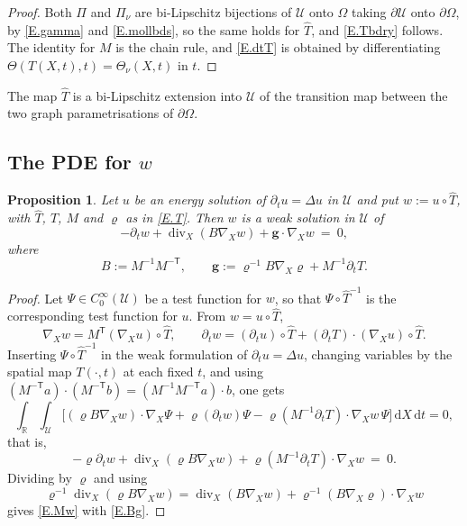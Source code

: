 \documentclass[12pt,leqno]{amsart}
\numberwithin{equation}{section}
\DeclareMathOperator{\divg}{div}
\newcommand{\R}{\mathbb R}
\newcommand{\br}[1]{\left(#1\right)}
\newcommand{\om}{\Omega}
\newcommand{\pom}{\partial\Omega}
\newcommand{\pd}{\partial}
\newcommand{\Uc}{\mathcal U}
\renewcommand{\d}{\,\mathrm d}
\theoremstyle{plain}
\newtheorem{proposition}[equation]{Proposition}
\theoremstyle{remark}
\begin{document}
\begin{proof}
Both $\Pi$ and $\Pi_\nu$ are bi-Lipschitz bijections of $\Uc$ onto $\om$ taking
$\pd\Uc$ onto $\pom$, by \eqref{E.gamma} and \eqref{E.mollbds}, so the same
holds for $\widehat T$, and \eqref{E.Tbdry} follows. The identity for $M$ is the chain
rule, and \eqref{E.dtT} is obtained by differentiating
$\Theta\br{T(X,t),t}=\Theta_\nu(X,t)$ in $t$.
\end{proof}

\noindent The map $\widehat T$ is a bi-Lipschitz extension into $\Uc$ of the transition
map between the two graph parametrisations of $\pom$.

\subsection{The PDE for $w$}\label{ss.pde}

\begin{proposition}\label{P.pde}
Let $u$ be an energy solution of $\pd_tu=\Delta u$ in $\Uc$ and put
$w:=u\circ\widehat T$, with $\widehat T$, $T$, $M$ and $\varrho$ as in
\eqref{E.T}. Then $w$ is a weak solution in $\Uc$ of
\begin{equation}\label{E.Mw}
  -\pd_tw+\divg_X\br{B\nabla_Xw}+\mathbf g\cdot\nabla_Xw\ =\ 0 ,
\end{equation}
where
\begin{equation}\label{E.Bg}
  B:=M^{-1}M^{-\mathsf T},\qquad
  \mathbf g:=\varrho^{-1}B\nabla_X\varrho+M^{-1}\pd_tT .
\end{equation}
\end{proposition}

\begin{proof}
Let $\Psi\in C^\infty_0(\Uc)$ be a test function for $w$, so that
$\Psi\circ\widehat T^{-1}$ is the corresponding test function for $u$. From
$w=u\circ\widehat T$,
$$\nabla_Xw=M^{\mathsf T}\br{\nabla_Xu}\circ\widehat T,\qquad
  \pd_tw=\br{\pd_tu}\circ\widehat T
  +\br{\pd_tT}\cdot\br{\nabla_Xu}\circ\widehat T .$$
Inserting $\Psi\circ\widehat T^{-1}$ in the weak formulation of
$\pd_tu=\Delta u$, changing
variables by the spatial map $T(\cdot,t)$ at each fixed $t$, and using
$\br{M^{-\mathsf T}a}\cdot\br{M^{-\mathsf T}b}
=\br{M^{-1}M^{-\mathsf T}a}\cdot b$, one gets
$$\int_\R\int_\Uc\Big[\br{\varrho B\nabla_Xw}\cdot\nabla_X\Psi
  +\varrho\br{\pd_tw}\Psi
  -\varrho\br{M^{-1}\pd_tT}\cdot\nabla_Xw\,\Psi\Big]\d X\d t=0 ,$$
that is,
$$-\varrho\pd_tw+\divg_X\br{\varrho B\nabla_Xw}
  +\varrho\br{M^{-1}\pd_tT}\cdot\nabla_Xw\ =\ 0 .$$
Dividing by $\varrho$ and using
$$\varrho^{-1}\divg_X\br{\varrho B\nabla_Xw}
  =\divg_X\br{B\nabla_Xw}+\varrho^{-1}\br{B\nabla_X\varrho}\cdot\nabla_Xw$$
gives \eqref{E.Mw} with \eqref{E.Bg}.
\end{proof}
\end{document}
